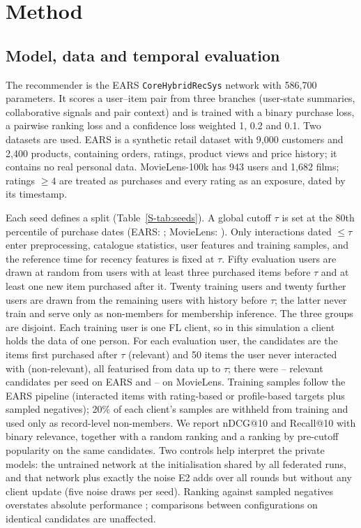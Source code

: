 \documentclass[11pt,a4paper]{article}
\begin{document}
\section{Method}

\subsection{Model, data and temporal evaluation}

The recommender is the EARS \texttt{CoreHybridRecSys} network \cite{gaspar2025ears} with 586,700 parameters. It scores a user--item pair from three branches (user-state summaries, collaborative signals and pair context) and is trained with a binary purchase loss, a pairwise ranking loss and a confidence loss weighted 1, 0.2 and 0.1. Two datasets are used. EARS is a synthetic retail dataset with 9,000 customers and 2,400 products, containing orders, ratings, product views and price history; it contains no real personal data. MovieLens-100k \cite{harper2015movielens} has 943 users and 1,682 films; ratings $\geq 4$ are treated as purchases and every rating as an exposure, dated by its timestamp.

Each seed defines a split (Table~\ref{S-tab:seeds}). A global cutoff $\tau$ is set at the 80th percentile of purchase dates (EARS: ; MovieLens: ). Only interactions dated $\leq \tau$ enter preprocessing, catalogue statistics, user features and training samples, and the reference time for recency features is fixed at $\tau$. Fifty evaluation users are drawn at random from users with at least three purchased items before $\tau$ and at least one new item purchased after it. Twenty training users and twenty further users are drawn from the remaining users with history before $\tau$; the latter never train and serve only as non-members for membership inference. The three groups are disjoint. Each training user is one FL client, so in this simulation a client holds the data of one person. For each evaluation user, the candidates are the items first purchased after $\tau$ (relevant) and 50 items the user never interacted with (non-relevant), all featurised from data up to $\tau$; there were -- relevant candidates per seed on EARS and -- on MovieLens. Training samples follow the EARS pipeline (interacted items with rating-based or profile-based targets plus sampled negatives); 20\% of each client's samples are withheld from training and used only as record-level non-members. We report nDCG@10 and Recall@10 with binary relevance, together with a random ranking and a ranking by pre-cutoff popularity on the same candidates. Two controls help interpret the private models: the untrained network at the initialisation shared by all federated runs, and that network plus exactly the noise E2 adds over all rounds but without any client update (five noise draws per seed). Ranking against sampled negatives overstates absolute performance \cite{krichene2020sampled}; comparisons between configurations on identical candidates are unaffected.
\end{document}
